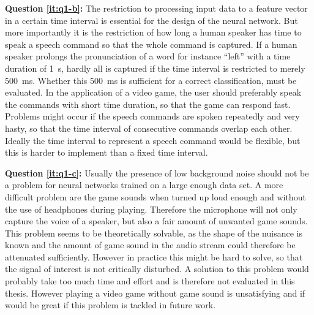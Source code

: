 \textbf{Question \ref{it:q1-b}:} 
The restriction to processing input data to a feature vector in a certain time interval is essential for the design of the neural network.
But more importantly it is the restriction of how long a human speaker has time to speak a speech command so that the whole command is captured. 
If a human speaker prolongs the pronunciation of a word for instance \enquote{left} with a time duration of \SI{1}{\second}, hardly all is captured if the time interval is restricted to merely \SI{500}{\milli\second}. 
Whether this \SI{500}{\milli\second} is sufficient for a correct classification, must be evaluated.
In the application of a video game, the user should preferably speak the commands with short time duration, so that the game can respond fast.
Problems might occur if the speech commands are spoken repeatedly and very hasty, so that the time interval of consecutive commands overlap each other.
Ideally the time interval to represent a speech command would be flexible, but this is harder to implement than a fixed time interval.

\textbf{Question \ref{it:q1-c}:}
Usually the presence of low background noise should not be a problem for neural networks trained on a large enough data set. 
A more difficult problem are the game sounds when turned up loud enough and without the use of headphones during playing. 
Therefore the microphone will not only capture the voice of a speaker, but also a fair amount of unwanted game sounds. 
This problem seems to be theoretically solvable, as the shape of the nuisance is known and the amount of game sound in the audio stream could therefore be attenuated sufficiently.
However in practice this might be hard to solve, so that the signal of interest is not critically disturbed.
A solution to this problem would probably take too much time and effort and is therefore not evaluated in this thesis. 
However playing a video game without game sound is unsatisfying and if would be great if this problem is tackled in future work.

